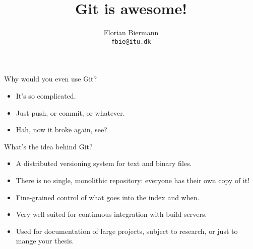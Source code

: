 \documentclass{beamer}
\title{Git is awesome!}
\author{Florian Biermann\\\texttt{fbie@itu.dk}}
\institute{Pit Lab\\IT University of Copenhagen}
\begin{document}
\frame{\titlepage}

\begin{frame}{Why would you even use Git?}

  \begin{itemize}
  \item It's so complicated.
  \item Just push, or commit, or whatever.
  \item Hah, now it broke again, see?
  \end{itemize}

\end{frame}

\begin{frame}{What's the idea behind Git?}

  \begin{itemize}
  \item A distributed versioning system for text and binary files.
  \item There is no single, monolithic repository: everyone has their own copy of it!
  \item Fine-grained control of what goes into the index and when.
  \item Very well suited for continuous integration with build servers.
  \item Used for documentation of large projects, subject to research, or just to mange your thesis.
  \end{itemize}

\end{frame}
\end{document}
